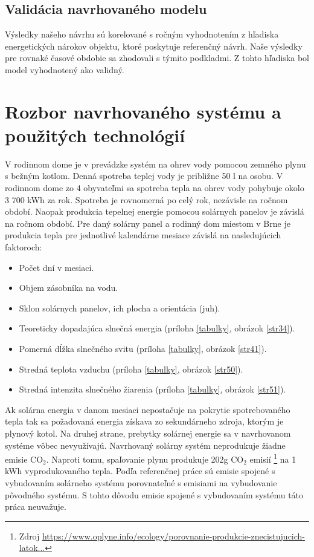 \documentclass[a4paper, 11pt]{article}
\begin{document}
\subsection{Validácia navrhovaného modelu}
Výsledky našeho návrhu sú korelované s ročným vyhodnotením z hľadiska energetických nárokov objektu, ktoré poskytuje referenčný návrh. Naše výsledky pre rovnaké časové obdobie sa zhodovali s týmito podkladmi. Z tohto hľadiska bol model vyhodnotený ako validný.

\section{Rozbor navrhovaného systému a použitých technológií}

V rodinnom dome je v prevádzke systém na ohrev vody pomocou zemného plynu s bežným kotlom. Denná spotreba teplej vody je približne 50 l na osobu. V rodinnom dome zo 4 obyvateľmi sa spotreba tepla na ohrev vody pohybuje okolo 3 700 kWh za rok. Spotreba je rovnomerná po celý rok, nezávisle na ročnom období. Naopak produkcia tepelnej energie pomocou solárnych panelov je závislá na ročnom období. Pre daný solárny panel a rodinný dom miestom v Brne je produkcia tepla pre jednotlivé kalendárne mesiace závislá na nasledujúcich faktoroch:
\begin{itemize}
	\item Počet dní v mesiaci.
	\item Objem zásobníka na vodu.
	\item Sklon solárnych panelov, ich plocha a orientácia (juh).
	\item Teoreticky dopadajúca slnečná energia (príloha \ref{tabulky}, obrázok \ref{str34}).
	\item Pomerná dĺžka slnečného svitu (príloha \ref{tabulky}, obrázok \ref{str41}).
	\item Stredná teplota vzduchu (príloha \ref{tabulky}, obrázok \ref{str50}).
	\item Stredná intenzita slnečného žiarenia (príloha \ref{tabulky}, obrázok \ref{str51}).
\end{itemize}

Ak solárna energia v danom mesiaci nepostačuje na pokrytie spotrebovaného tepla tak sa požadovaná energia získava zo sekundárneho zdroja, ktorým je plynový kotol. Na druhej strane, prebytky solárnej energie sa v navrhovanom systéme vôbec nevyužívajú. Navrhovaný solárny systém neprodukuje žiadne emisie CO$_2$. Naproti tomu, spaľovanie plynu produkuje 202g CO$_2$ emisií \footnote{Zdroj \href{https://www.oplyne.info/ecology/porovnanie-produkcie-znecistujucich-latok-so2-tzl-nox-co-a-sklenikoveho-plynu-co2-vyprodukovanych-spalinami-v-rodinnom-dome-vykurovanie-drevom-ciernym-hnedym-uhlim-a-zemnym-plynom/}{https://www.oplyne.info/ecology/porovnanie-produkcie-znecistujucich-latok...}}  na 1 kWh vyprodukovaného tepla. Podľa referenčnej práce sú emisie spojené s vybudovaním solárneho systému porovnateľné s emisiami na vybudovanie pôvodného systému. S tohto dôvodu emisie spojené s vybudovaním systému táto práca neuvažuje. 
\end{document}
